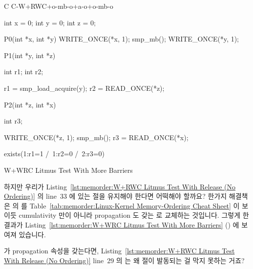 \begin{listing}[tbp]
{ \scriptsize
\begin{verbbox}[\LstLineNo]
C C-W+RWC+o-mb-o+a-o+o-mb-o

{
int x = 0;
int y = 0;
int z = 0;
}

P0(int *x, int *y)
{
  WRITE_ONCE(*x, 1);
  smp_mb();
  WRITE_ONCE(*y, 1);
}

P1(int *y, int *z)
{
  int r1;
  int r2;

  r1 = smp_load_acquire(y);
  r2 = READ_ONCE(*z);
}

P2(int *z, int *x)
{
  int r3;

  WRITE_ONCE(*z, 1);
  smp_mb();
  r3 = READ_ONCE(*x);
}

exists(1:r1=1 /\ 1:r2=0 /\ 2:r3=0)
\end{verbbox}
}
\centering
\theverbbox
\caption{W+WRC Litmus Test With More Barriers}
\label{lst:memorder:W+WRC Litmus Test With More Barriers}
\end{listing}

하지만 우리가
Listing~\ref{lst:memorder:W+RWC Litmus Test With Release (No Ordering)}
의 line~33 에 있는  절을 유지해야 한다면 어떡해야 할까요?
한가지 해결책은  의  를
Table~\ref{tab:memorder:Linux-Kernel Memory-Ordering Cheat Sheet}
이 보이듯 cumulativity 만이 아니라 propagation 도 갖는
 로 교체하는 것입니다.
그렇게 한 결과가
Listing~\ref{lst:memorder:W+WRC Litmus Test With More Barriers}
()
에 보여져 있습니다.

\QuickQuiz{}
	 가 propagation 속성을 갖는다면,
	Listing~\ref{lst:memorder:W+RWC Litmus Test With Release (No Ordering)}
	line~29 의  는 왜  절이 발동되는 걸 막지 못하는
	거죠?
	\iffalse

